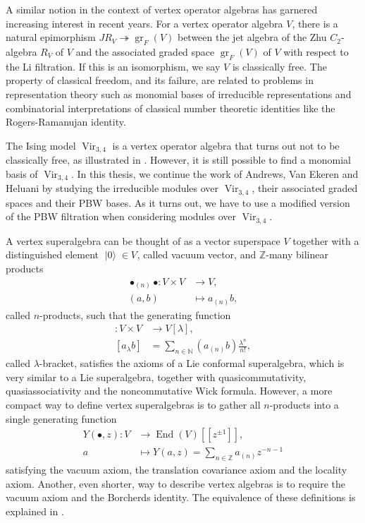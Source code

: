 \documentclass[a4paper, 12pt, reqno]{amsart}
\theoremstyle{remark}
\DeclareMathOperator{\Vir}{Vir}
\DeclareMathOperator{\gr}{gr}
\DeclareMathOperator{\End}{End}
\DeclareMathOperator{\vac}{|0\rangle}
\DeclareMathOperator{\zero}{\overline{0}}
\begin{document}
A similar notion in the context of vertex operator algebras has garnered increasing interest in recent years.
For a vertex operator algebra $V$, there is a natural epimorphism $JR_V \twoheadrightarrow \gr_F(V)$ between the jet algebra of the Zhu $C_2$-algebra $R_V$ of $V$ and the associated graded space $\gr_F(V)$ of $V$ with respect to the Li filtration.
If this is an isomorphism, we say $V$ is classically free.
The property of classical freedom, and its failure, are related to problems in representation theory such as monomial bases of irreducible representations and combinatorial interpretations of classical number theoretic identities like the Rogers-Ramanujan identity.

The Ising model $\Vir_{3, 4}$ is a vertex operator algebra that turns out not to be classically free, as illustrated in \cite{andrews_singular_2022}.
However, it is still possible to find a monomial basis of $\Vir_{3, 4}$.
In this thesis, we continue the work of Andrews, Van Ekeren and Heluani by studying the irreducible modules over $\Vir_{3, 4}$, their associated graded spaces and their PBW bases.
As it turns out, we have to use a modified version of the PBW filtration when considering modules over $\Vir_{3, 4}$.

A vertex superalgebra can be thought of as a vector superspace $V$ together with a distinguished element $\vac \in V_{\zero}$, called vacuum vector, and $\mathbb{Z}$-many bilinear products
\begin{align*}
  \bullet_{(n)}\bullet: V \times V &\to V, \\
  (a, b) &\mapsto a_{(n)}b,
\end{align*}
called $n$-products, such that the generating function
\begin{align*}
  [\bullet_{\lambda}\bullet]: V \times V &\to V[\lambda], \\
  [a_{\lambda}b] &= \sum_{n \in \mathbb{N}}(a_{(n)}b)\frac{\lambda^n}{n!},
\end{align*}
called $\lambda$-bracket, satisfies the axioms of a Lie conformal superalgebra, which is very similar to a Lie superalgebra, together with quasicommutativity, quasiassociativity and the noncommutative Wick formula.
However, a more compact way to define vertex superalgebras is to gather all $n$-products into a single generating function
\begin{align*}
  Y(\bullet, z): V &\to \End(V)[[z^{\pm1}]], \\
  a &\mapsto Y(a, z) = \sum_{n \in \mathbb{Z}}a_{(n)}z^{-n - 1}
\end{align*}
satisfying the vacuum axiom, the translation covariance axiom and the locality axiom.
Another, even shorter, way to describe vertex algebras is to require the vacuum axiom and the Borcherds identity.
The equivalence of these definitions is explained in \cite[\S1]{de_sole_finite_2006}.
\end{document}
